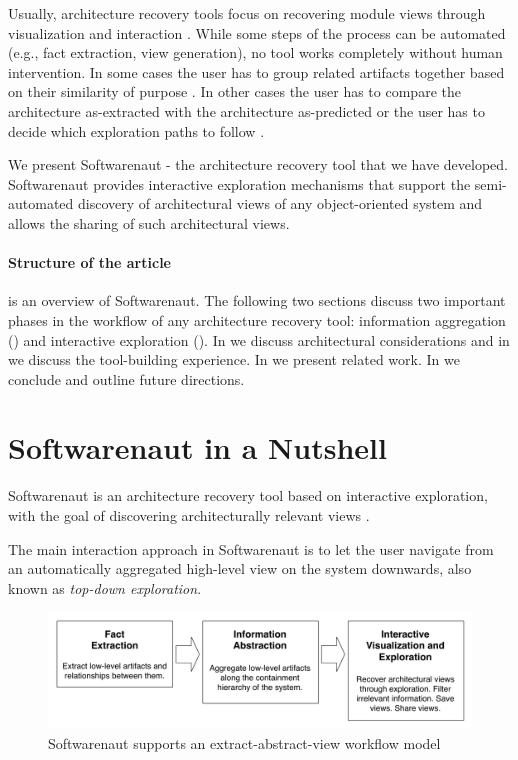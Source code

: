 \documentclass[preprint,12pt]{elsarticle}
\begin{document}
Usually, architecture recovery tools focus on recovering module views through visualization and interaction \cite{murphy-reflexion, muller-rigi, storey-shrimp}. While some steps of the process can be automated (e.g., fact extraction, view generation), no tool works completely without human intervention. In some cases the user has to group related artifacts together based on their similarity of purpose \cite{muller-rigi}. In other cases the user has to compare the architecture as-extracted with the architecture as-predicted \cite{murphy-reflexion} or the user has to decide which exploration paths to follow \cite{storey-shrimp}.

We present Softwarenaut \cite{lungu-relevo, lungu-packages} - the architecture recovery tool that we have developed. Softwarenaut provides interactive exploration mechanisms that support the semi-automated discovery of architectural views of any object-oriented system and allows the sharing of such architectural views. 

{
\paragraph{Structure of the article}  is an overview of Softwarenaut. The following two sections discuss two important phases in the workflow of any architecture recovery tool: information aggregation () and interactive exploration (). In  we discuss architectural considerations and in  we discuss the tool-building experience. In  we present related work. In  we conclude and outline future directions.

}
\section {Softwarenaut in a Nutshell} \label{sec:over}

Softwarenaut is an architecture recovery tool based on interactive exploration, with the goal of discovering architecturally relevant views \cite{lungu-packages}.

The main interaction approach in Softwarenaut is to let the user navigate from an automatically aggregated high-level view on the system downwards, also known as {\em top-down exploration}.


\begin{figure}[h]
\begin{center}
\includegraphics[width=\linewidth]{SnautWorkflow}
\caption{Softwarenaut supports an extract-abstract-view workflow model}
\end{center}
\end{figure}
\end{document}

